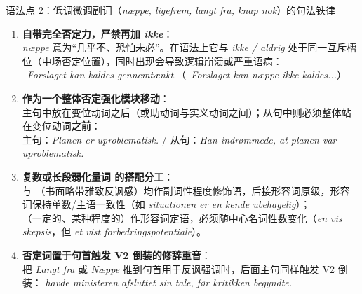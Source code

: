 \begin{grammatikbox}{语法点 2：低调微调副词（\textit{næppe, ligefrem, langt fra, knap nok}）的句法铁律}
\begin{enumerate}
  \item \textbf{ 自带完全否定力，严禁再加 \textit{ikke}}：\\
    \textit{næppe} 意为“几乎不、恐怕未必”。在语法上它与 \textit{ikke / aldrig} 处于同一互斥槽位（中场否定位置），同时出现会导致逻辑崩溃或严重语病：\\
    \ \textit{Forslaget kan  kaldes gennemtænkt.}（\ \textit{Forslaget kan næppe ikke kaldes...}）
  \item \textbf{ 作为一个整体否定强化模块移动}：\\
    主句中放在变位动词之后（或助动词与实义动词之间）；从句中则必须整体站在变位动词\textbf{之前}：\\
    主句：\textit{Planen er  uproblematisk.} / 从句：\textit{Han indrømmede, at planen  var uproblematisk.}
  \item \textbf{复数或长段弱化量词  的搭配分工}：\\
      与 （书面略带雅致反讽感）均作副词性程度修饰语，后接形容词原级，形容词保持单数/主语一致性（如 \textit{situationen er en kende ubehagelig}）；\\
     （一定的、某种程度的）作形容词定语，必须随中心名词性数变化（\textit{en vis skepsis}，但 \textit{et vist forbedringspotentiale}）。
  \item \textbf{否定词置于句首触发 V2 倒装的修辞重音}：\\
    把 \textit{Langt fra} 或 \textit{Næppe} 推到句首用于反讽强调时，后面主句同样触发 V2 倒装：\textit{ havde ministeren afsluttet sin tale, før kritikken begyndte.}
\end{enumerate}
\end{grammatikbox}

